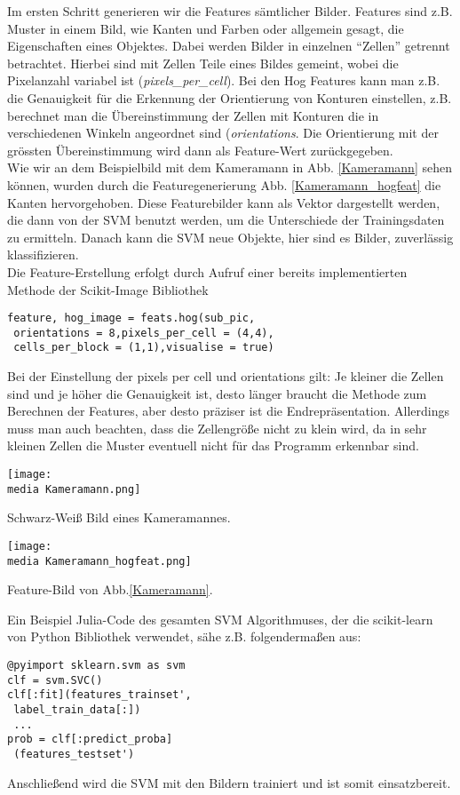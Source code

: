 Im ersten Schritt generieren wir die Features sämtlicher Bilder. Features sind z.B. Muster in einem Bild, wie Kanten und Farben oder allgemein gesagt, die Eigenschaften eines Objektes. Dabei werden Bilder in einzelnen \enquote{Zellen} getrennt betrachtet. Hierbei sind mit Zellen Teile eines Bildes gemeint, wobei die Pixelanzahl variabel ist (\textit{pixels\_per\_cell}). Bei den Hog Features kann man z.B. die Genauigkeit f\"ur die Erkennung der Orientierung von Konturen einstellen, z.B. berechnet man die \"Ubereinstimmung der Zellen mit Konturen die in verschiedenen Winkeln angeordnet sind (\textit{orientations}. Die Orientierung mit der gr\"ossten \"Ubereinstimmung wird dann als Feature-Wert zur\"uckgegeben.\\
%
Wie wir an dem Beispielbild mit dem Kameramann in Abb. \ref{Kameramann} sehen können, wurden durch die Featuregenerierung Abb. \ref{Kameramann_hogfeat} die Kanten hervorgehoben. Diese Featurebilder kann als Vektor dargestellt werden, die dann von der SVM benutzt werden, um die Unterschiede der Trainingsdaten zu ermitteln. Danach kann die SVM neue Objekte, hier sind es Bilder, zuverl\"assig klassifizieren.\\ 
%
Die Feature-Erstellung erfolgt durch Aufruf einer bereits implementierten Methode der Scikit-Image Bibliothek
\begin{verbatim}
feature, hog_image = feats.hog(sub_pic,
 orientations = 8,pixels_per_cell = (4,4),
 cells_per_block = (1,1),visualise = true)
\end{verbatim}

Bei der Einstellung der pixels per cell und orientations gilt: Je kleiner die Zellen sind und je höher die Genauigkeit ist, desto länger braucht die Methode zum Berechnen der Features, aber desto pr\"aziser ist die Endrepr\"asentation. Allerdings muss man auch beachten, dass die Zellengröße nicht zu klein wird, da in sehr kleinen Zellen die Muster eventuell nicht für das Programm erkennbar sind. 

\begin{dsafigure}
\begin{center}
	\texttt{[image: \\media Kameramann.png]}
	\caption{Schwarz-Weiß Bild eines Kameramannes.}
	\label{Kameramann}
\end{center}
\end{dsafigure}

\begin{dsafigure}
\begin{center}
	\texttt{[image: \\media Kameramann\_hogfeat.png]}
	\caption{Feature-Bild von Abb.\ref{Kameramann}.}
	\label{Kameramann_hogfeat}
\end{center}
\end{dsafigure}

Ein Beispiel Julia-Code des gesamten SVM Algorithmuses, der die scikit-learn von Python Bibliothek verwendet, s\"ahe z.B. folgenderma\ss en aus: 
\begin{verbatim}
@pyimport sklearn.svm as svm
clf = svm.SVC()
clf[:fit](features_trainset', 
 label_train_data[:])
 ...
prob = clf[:predict_proba]
 (features_testset')
\end{verbatim}
Anschließend wird die SVM mit den Bildern trainiert und ist somit einsatzbereit.

